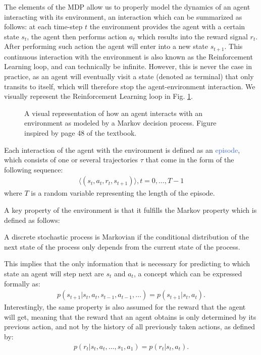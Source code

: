 
The elements of the MDP allow us to properly model the dynamics of an agent interacting with its environment, an interaction which can be summarized as follows: at each time-step $t$ the environment provides the agent with a certain state $s_t$, the agent then performs action $a_t$ which results into the reward signal $r_{t}$. After performing such action the agent will enter into a new state $s_{t+1}$. This continuous interaction with the environment is also known as the Reinforcement Learning loop, and can technically be infinite. However, this is never the case in practice, as an agent will eventually visit a state (denoted as terminal) that only transits to itself, which will therefore stop the agent-environment interaction. We visually represent the Reinforcement Learning loop in Fig. \ref{fig:rl_loop}.

\begin{figure}[htb!]
	\centering
	
\caption{A visual representation of how an agent interacts with an environment as modeled by a Markov decision process. Figure inspired by page 48 of the \citet{sutton2018reinforcement} textbook.}
  \label{fig:rl_loop}
\end{figure}

Each interaction of the agent with the environment is defined as an \textcolor{RoyalBlue}{episode}, which consists of one or several trajectories $\tau$ that come in the form of the following sequence:
\begin{align}
	\langle(s_t,a_t,r_t,s_{t+1})\rangle,t=0,\ldots,T-1
\end{align}
where $T$ is a random variable representing the length of the episode.

A key property of the environment is that it fulfills the Markov property which is defined as follows:
\begin{definition}
	A discrete stochastic process is Markovian if the conditional distribution of the next state of the process only depends from the current state of the process.
\end{definition}
This implies that the only information that is necessary for predicting to which state an agent will step next are $s_t$ and $a_t$, a concept which can be expressed formally as:
\begin{align}
	p(s_{t+1}|s_t, a_t, s_{t-1}, a_{t-1}, \ldots) = p(s_{t+1} | s_t, a_t).
\end{align}
Interestingly, the same property is also assumed for the reward that the agent will get, meaning that the reward that an agent obtains is only determined by its previous action, and not by the history of all previously taken actions, as defined by:
\begin{align}
	p(r_t| s_t, a_t, \ldots, s_1, a_1) = p(r_t|s_t,a_t).
\end{align}


